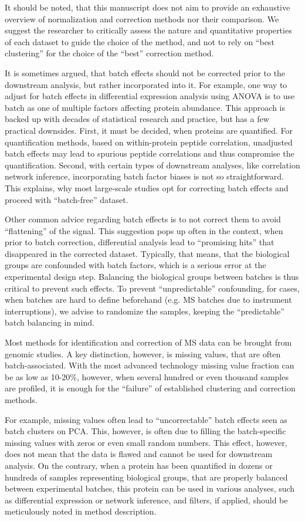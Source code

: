 \documentclass[num-refs]{wiley-article}
\begin{document}
It should be noted, that this manuscript does not aim to provide an exhaustive overview of normalization and correction methods nor their comparison. We suggest the researcher to critically assess the nature and quantitative properties of each dataset to guide the choice of the method, and not to rely on “best clustering” for the choice of the “best” correction method.

It is sometimes argued, that batch effects should not be corrected prior to the downstream analysis, but rather incorporated into it. For example, one way to adjust for batch effects in differential expression analysis using ANOVA is to use batch as one of multiple factors affecting protein abundance. This approach is backed up with decades of statistical research and practice, but has a few practical downsides. First, it must be decided, when proteins are quantified. For quantification methods, based on within-protein peptide correlation, unadjusted batch effects may lead to spurious peptide correlations and thus compromise the quantification. Second, with certain types of downstream analyses, like correlation network inference, incorporating batch factor biases is not so straightforward. This explains, why most large-scale studies opt for correcting batch effects and proceed with “batch-free” dataset.

Other common advice regarding batch effects is to not correct them to avoid “flattening” of the signal. This suggestion pops up often in the context, when prior to batch correction, differential analysis lead to “promising hits” that disappeared in the corrected dataset. Typically, that means, that the biological groups are confounded with batch factors, which is a serious error at the experimental design step. Balancing the biological groups between batches is thus critical to prevent such effects. To prevent “unpredictable” confounding, for cases, when batches are hard to define beforehand (e.g. MS batches due to instrument interruptions), we advise to randomize the samples, keeping the “predictable” batch balancing in mind.

Most methods for identification and correction of MS data can be brought from genomic studies. A key distinction, however, is missing values, that are often batch-associated. With the most advanced technology missing value fraction can be as low as 10-20\%, however, when several hundred or even thousand samples are profiled, it is enough for the “failure” of established clustering and correction methods.

For example, missing values often lead to “uncorrectable” batch effects seen as batch clusters on PCA. This, however, is often due to filling the batch-specific missing values with zeros or even small random numbers. This effect, however, does not mean that the data is flawed and cannot be used for downstream analysis. On the contrary, when a protein has been quantified in dozens or hundreds of samples representing biological groups, that are properly balanced between experimental batches, this protein can be used in various analyses, such as differential expression or network inference, and filters, if applied, should be meticulously noted in method description.
\end{document}
